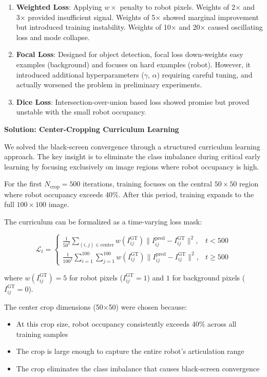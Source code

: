 \documentclass[12pt,a4paper,oneside]{report}
\begin{document}
\begin{enumerate}
    \item \textbf{Weighted Loss}: Applying $w \times$ penalty to robot pixels. Weights of 2× and 3× provided insufficient signal. Weights of 5× showed marginal improvement but introduced training instability. Weights of 10× and 20× caused oscillating loss and mode collapse.
    \item \textbf{Focal Loss}: Designed for object detection, focal loss down-weights easy examples (background) and focuses on hard examples (robot). However, it introduced additional hyperparameters ($\gamma$, $\alpha$) requiring careful tuning, and actually worsened the problem in preliminary experiments.
    \item \textbf{Dice Loss}: Intersection-over-union based loss showed promise but proved unstable with the small robot occupancy.
\end{enumerate}

\textbf{Solution: Center-Cropping Curriculum Learning}

We solved the black-screen convergence through a structured curriculum learning approach. The key insight is to eliminate the class imbalance during critical early learning by focusing exclusively on image regions where robot occupancy is high.

For the first $N_{\text{crop}} = 500$ iterations, training focuses on the central $50 \times 50$ region where robot occupancy exceeds 40\%. After this period, training expands to the full $100 \times 100$ image.

The curriculum can be formalized as a time-varying loss mask:

\begin{equation}
\mathcal{L}_t = \begin{cases}
\frac{1}{50^2} \sum_{(i,j) \in \text{center}} w(I_{ij}^{\text{GT}}) \|I_{ij}^{\text{pred}} - I_{ij}^{\text{GT}}\|^2, & t < 500 \\
\frac{1}{100^2} \sum_{i=1}^{100}\sum_{j=1}^{100} w(I_{ij}^{\text{GT}}) \|I_{ij}^{\text{pred}} - I_{ij}^{\text{GT}}\|^2, & t \geq 500
\end{cases}
\end{equation}

where $w(I_{ij}^{\text{GT}}) = 5$ for robot pixels ($I_{ij}^{\text{GT}} = 1$) and $1$ for background pixels ($I_{ij}^{\text{GT}} = 0$).

The center crop dimensions (50×50) were chosen because:

\begin{itemize}
    \item At this crop size, robot occupancy consistently exceeds 40\% across all training samples
    \item The crop is large enough to capture the entire robot's articulation range
    \item The crop eliminates the class imbalance that causes black-screen convergence
\end{itemize}
\end{document}
